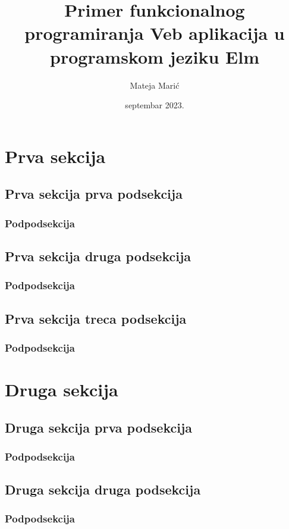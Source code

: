 \documentclass{viser-thesis}
\author{Mateja Marić}
\title{Primer funkcionalnog programiranja Veb aplikacija u programskom jeziku Elm}
\date{septembar 2023.}
\begin{document}
\maketitle
\infopage
\tableofcontents
\newpage

\section{Prva sekcija}
\newpage
\subsection{Prva sekcija prva podsekcija}
\newpage
\subsubsection{Podpodsekcija}
\newpage
\subsection{Prva sekcija druga podsekcija}
\newpage
\subsubsection{Podpodsekcija}
\newpage
\subsection{Prva sekcija treca podsekcija}
\newpage
\subsubsection{Podpodsekcija}
\newpage

\section{Druga sekcija}
\newpage
\subsection{Druga sekcija prva podsekcija}
\newpage
\subsubsection{Podpodsekcija}
\newpage
\subsection{Druga sekcija druga podsekcija}
\newpage
\subsubsection{Podpodsekcija}
\newpage
\end{document}
